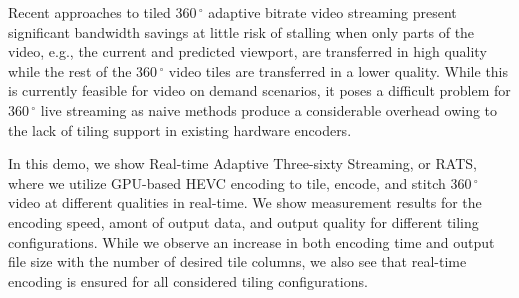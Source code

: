 Recent approaches to tiled $360\,^{\circ}$ adaptive bitrate video streaming present significant bandwidth savings at little risk of stalling when only parts of the video, e.g., the current and predicted viewport, are transferred in high quality while the rest of the $360\,^{\circ}$ video tiles are transferred in a lower quality. While this is currently feasible for video on demand scenarios, it poses a difficult problem for $360\,^{\circ}$ live streaming as naive methods produce a considerable overhead owing to the lack of tiling support in existing hardware encoders.

In this demo, we show Real-time Adaptive Three-sixty Streaming, or RATS, where we utilize GPU-based HEVC encoding to tile, encode, and stitch $360\,^{\circ}$ video at different qualities in real-time. We show measurement results for the encoding speed, amont of output data, and output quality for different tiling configurations. While we observe an increase in both encoding time and output file size with the number of desired tile columns, we also see that real-time encoding is ensured for all considered tiling configurations.
